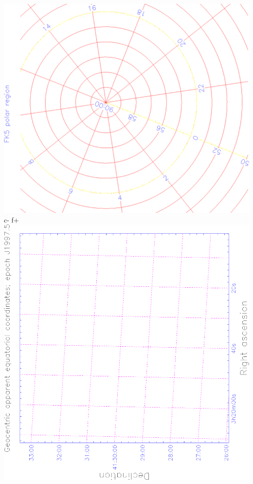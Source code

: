 \documentclass[twoside,11pt]{article}
\begin{document}
\begin{htmlonly}
   \includegraphics[scale=0.3,angle=-90]{sun211_figures/frontc.eps}
c-
f+
   \includegraphics[scale=0.3,angle=-90]{sun210_figures/fronta.eps}\hfill

\end{htmlonly}
\end{document}
